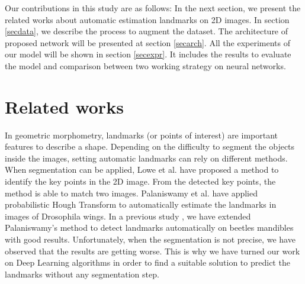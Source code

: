 \documentclass[12pt,a4paper]{article}
\begin{document}
Our contributions in this study are as follows: In the next section, we present the related works about automatic estimation landmarks on 2D images. In section \ref{secdata}, we describe the process to augment the dataset. The architecture of proposed network will be presented at section \ref{secarch}. All the experiments of our model will be shown in section \ref{secexpr}. It includes the results to evaluate the model and comparison between two working strategy on neural networks.

\section{Related works}
In geometric morphometry, landmarks (or points of interest) are important features to describe a shape. Depending on the difficulty to segment the objects inside the images, setting automatic landmarks can rely on different methods. When segmentation can be applied, Lowe et al. \cite{lowe2004distinctive} have proposed a method to identify the key points in the 2D image. From the detected key points, the method is able to match two images. Palaniswamy et al. \cite{palaniswamy2010automatic} have applied probabilistic Hough Transform to automatically estimate the landmarks in images
of Drosophila wings. In a previous study \cite{le2017maelab}, we have extended
Palaniswamy’s method to detect landmarks automatically on
beetles mandibles with good results. Unfortunately, when the
segmentation is not precise, we have observed that the results
are getting worse. This is why we have turned our work on
Deep Learning algorithms in order to find a suitable solution to
predict the landmarks without any segmentation step.
\end{document}
